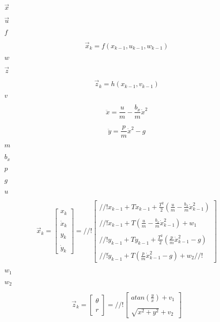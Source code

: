 \documentclass{article}
\begin{document}
$ \vec x $
\pagebreak

$ \vec u $
\pagebreak

$ f $
\pagebreak

\[ \vec x_k = f \left( x_{k-1}, u_{k-1}, w_{k-1} \right) \]
\pagebreak

$ w $
\pagebreak

$ \vec z $
\pagebreak

\[ \vec z_k = h \left( x_{k-1}, v_{k-1} \right) \]
\pagebreak

$ v $
\pagebreak

\[ \ddot x = \frac{u}{m} - \frac{b_x}{m} \dot x^{2} \]
\pagebreak

\[ \ddot y = \frac{p}{m} \dot x^{2} - g \]
\pagebreak

$ m $
\pagebreak

$ b_{x} $
\pagebreak

$ p $
\pagebreak

$ g $
\pagebreak

$ u $
\pagebreak

\[\vec x_k = \left [ \begin{array}{c} x_k \\ \\ \dot x_k \\ \\ y_k \\ \\ \dot y_k \end{array} \right] = //! \left [ \begin{array}{c} //! x_{k-1} + T \dot x_{k-1} + \frac{T^{2}}{2} \left( \frac{u}{m} - \frac{b_x}{m} \dot x_{k-1}^{2} \right )\\ \\ //! \dot x_{k-1} + T \left ( \frac{u}{m} - \frac{b_x}{m} \dot x_{k-1}^{2} \right ) + w_{1} \\ \\ //! y_{k-1} + T \dot y_{k-1} + \frac{T^{2}}{2} \left( \frac{p}{m} \dot x_{k-1}^{2} - g \right )\\ \\ //! \dot y_{k-1} + T \left( \frac{p}{m} \dot x_{k-1}^{2} - g \right ) + w_{2} //! \end{array} \right ] \]
\pagebreak

$ w_{1} $
\pagebreak

$ w_{2} $
\pagebreak

\[\vec z_k = \left [ \begin{array}{c} \theta \\ \\ r \end{array} \right ] = //! \left [ \begin{array}{c} atan(\frac{y}{x}) +v_{1} \\ \\ \sqrt{x^{2}+y^{2}} + v_{2} \end{array} \right ] \]
\pagebreak
\end{document}
